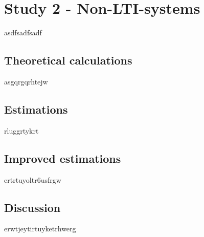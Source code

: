 \section{Study 2 - Non-LTI-systems}
asdfsadfsadf
\subsection{Theoretical calculations}
asgqrgqrhtejw
\subsection{Estimations}
rluggrtykrt
\subsection{Improved estimations}
ertrtuyoltr6usfrgw
\subsection{Discussion}
erwtjeytirtuyketrhwerg
